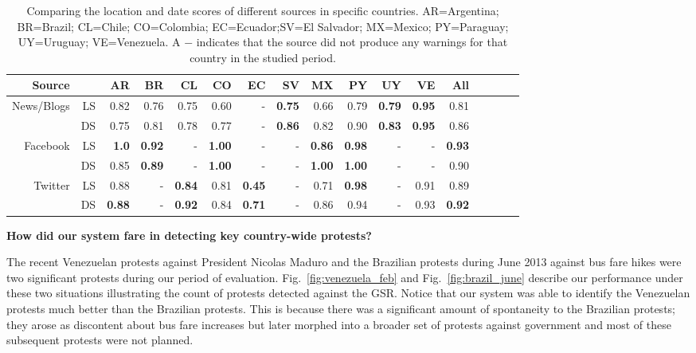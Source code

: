 \documentclass[letterpaper]{article}
\begin{document}
\begin{table} %
  \small
\centering
\caption{\small Comparing the location and date scores of different sources in specific countries.
AR=Argentina; BR=Brazil; CL=Chile; CO=Colombia; EC=Ecuador;SV=El
Salvador; MX=Mexico; PY=Paraguay; UY=Uruguay; VE=Venezuela. A $-$
indicates that the source did not produce any warnings for that country
in the studied period.} \label{tb:modelwisecomparison}
\begin{tabular}{@{}rrrrrrrrrrrrrrrrr@{}}
\toprule
Source& & AR & BR & CL & CO & EC & SV & MX & PY & UY & VE & All\\
\midrule
\multirow{2}{*}{News/Blogs} &LS &0.82&0.76&0.75&0.60&-&{\bf0.75}&0.66&0.79&{\bf0.79}&{\bf0.95}&0.81\\
                            &DS&0.75&0.81&0.78&0.77&-&{\bf0.86}&0.82&0.90&{\bf0.83}&{\bf0.95}&0.86\\
\midrule
\multirow{2}{*}{Facebook} &LS &{\bf1.0}&{\bf0.92}&-&{\bf1.00}&-&-&{\bf0.86}&{\bf0.98}&-&-&{\bf0.93}\\
                          &DS&0.85&{\bf0.89}&-&{\bf1.00}&-&-&{\bf1.00}&{\bf1.00}&-&-&0.90\\
\midrule
\multirow{2}{*}{Twitter} &LS &0.88&-&{\bf0.84}&0.81&{\bf0.45}&-&0.71&{\bf0.98}&-&0.91&0.89\\
                         &DS&{\bf0.88}&-&{\bf0.92}&0.84&{\bf0.71}&-&0.86&0.94&-&0.93&{\bf0.92}\\
\bottomrule
\end{tabular}
\end{table}

\noindent
{\bf How did our system fare in detecting key country-wide protests?}

The recent Venezuelan protests against President Nicolas Maduro and the
Brazilian protests during June 2013 against bus fare hikes were two
significant protests during our period of evaluation.
Fig.~\ref{fig:venezuela_feb} and Fig.~\ref{fig:brazil_june} describe our
performance under these two situations illustrating the count of
protests detected against the GSR. Notice that our system was able to
identify the Venezuelan protests much better than the Brazilian
protests. This is because there was a significant amount of spontaneity
to the Brazilian protests; they arose as discontent about bus fare
increases but later morphed into a broader set of protests against
government and most of these subsequent protests were not planned.\\
\end{document}
